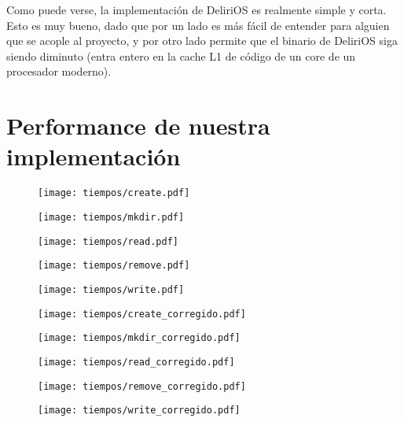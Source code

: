 Como puede verse, la implementación de DeliriOS es realmente simple y corta. Esto es muy bueno, dado que por un lado es más fácil de entender para alguien que se acople al proyecto, y por otro lado permite que el binario de DeliriOS siga siendo diminuto (entra entero en la cache L1 de código de un core de un procesador moderno).



\section{Performance de nuestra implementación}

\begin{figure}[H]
  \centering
  \texttt{[image: tiempos/create.pdf]}
  \caption{}
\end{figure}
\begin{figure}[H]
  \centering
  \texttt{[image: tiempos/mkdir.pdf]}
  \caption{}
\end{figure}
\begin{figure}[H]
  \centering
  \texttt{[image: tiempos/read.pdf]}
  \caption{}
\end{figure}
\begin{figure}[H]
  \centering
  \texttt{[image: tiempos/remove.pdf]}
  \caption{}
\end{figure}
\begin{figure}[H]
  \centering
  \texttt{[image: tiempos/write.pdf]}
  \caption{}
\end{figure}

\begin{figure}[H]
  \centering
  \texttt{[image: tiempos/create\_corregido.pdf]}
  \caption{}
\end{figure}
\begin{figure}[H]
  \centering
  \texttt{[image: tiempos/mkdir\_corregido.pdf]}
  \caption{}
\end{figure}
\begin{figure}[H]
  \centering
  \texttt{[image: tiempos/read\_corregido.pdf]}
  \caption{}
\end{figure}
\begin{figure}[H]
  \centering
  \texttt{[image: tiempos/remove\_corregido.pdf]}
  \caption{}
\end{figure}
\begin{figure}[H]
  \centering
  \texttt{[image: tiempos/write\_corregido.pdf]}
  \caption{}
\end{figure}


